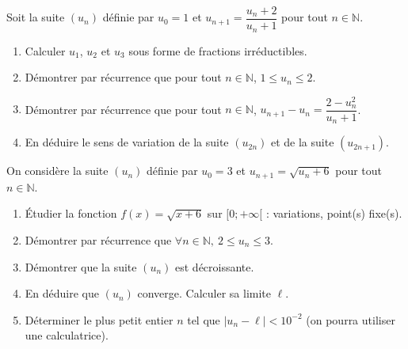 \documentclass[11pt]{article}
\begin{document}
\begin{exercice}
Soit la suite $(u_n)$ définie par $u_0 = 1$ et $u_{n+1} = \dfrac{u_n + 2}{u_n + 1}$ pour tout $n \in \mathbb{N}$.
\begin{enumerate}
    \item Calculer $u_1$, $u_2$ et $u_3$ sous forme de fractions irréductibles.
    \item Démontrer par récurrence que pour tout $n \in \mathbb{N}$, $1 \leq u_n \leq 2$.
    \item Démontrer par récurrence que pour tout $n \in \mathbb{N}$, $u_{n+1} - u_n = \dfrac{2 - u_n^2}{u_n + 1}$.
    \item En déduire le sens de variation de la suite $(u_{2n})$ et de la suite $(u_{2n+1})$.
\end{enumerate}
\end{exercice}

\begin{exercice}[Suite récurrente $u_{n+1} = f(u_n)$ : étude complète]
On considère la suite $(u_n)$ définie par $u_0 = 3$ et $u_{n+1} = \sqrt{u_n + 6}$ pour tout $n \in \mathbb{N}$.
\begin{enumerate}
    \item Étudier la fonction $f(x) = \sqrt{x + 6}$ sur $[0 ; +\infty[$ : variations, point(s) fixe(s).
    \item Démontrer par récurrence que $\forall n \in \mathbb{N},\ 2 \leq u_n \leq 3$.
    \item Démontrer que la suite $(u_n)$ est décroissante.
    \item En déduire que $(u_n)$ converge. Calculer sa limite $\ell$.
    \item Déterminer le plus petit entier $n$ tel que $|u_n - \ell| < 10^{-2}$ (on pourra utiliser une calculatrice).
\end{enumerate}
\end{exercice}
\end{document}
